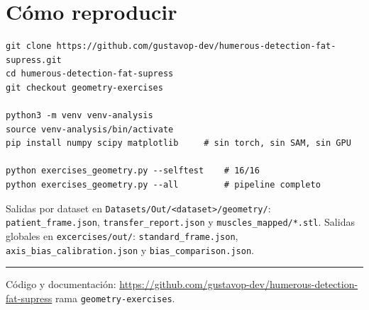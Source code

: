 \documentclass[11pt,a4paper]{article}
\newcommand{\ghrepo}{https://github.com/gustavop-dev/humerous-detection-fat-supress}
\newcommand{\ghbranch}{geometry-exercises}
\begin{document}
\section{Cómo reproducir}

\begin{verbatim}
git clone https://github.com/gustavop-dev/humerous-detection-fat-supress.git
cd humerous-detection-fat-supress
git checkout geometry-exercises

python3 -m venv venv-analysis
source venv-analysis/bin/activate
pip install numpy scipy matplotlib     # sin torch, sin SAM, sin GPU

python exercises_geometry.py --selftest    # 16/16
python exercises_geometry.py --all         # pipeline completo
\end{verbatim}

\noindent
Salidas por dataset en \texttt{Datasets/Out/<dataset>/geometry/}:
\texttt{patient\_frame.json}, \texttt{transfer\_report.json} y
\texttt{muscles\_mapped/*.stl}. Salidas globales en \texttt{excercises/out/}:
\texttt{standard\_frame.json}, \texttt{axis\_bias\_calibration.json} y
\texttt{bias\_comparison.json}.

\vspace{0.4cm}
\hrule
\vspace{0.25cm}
\noindent\small
Código y documentación: \url{\ghrepo} \quad rama \texttt{\ghbranch}.
\end{document}

